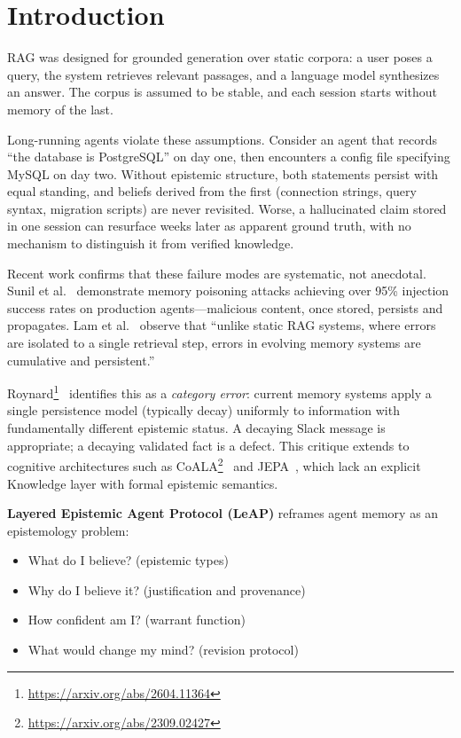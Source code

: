 \documentclass[11pt,letterpaper]{article}
\begin{document}
\section{Introduction}

RAG was designed for grounded generation over static corpora: a user poses a query, the system retrieves relevant passages, and a language model synthesizes an answer. The corpus is assumed to be stable, and each session starts without memory of the last.

Long-running agents violate these assumptions. Consider an agent that records ``the database is PostgreSQL'' on day one, then encounters a config file specifying MySQL on day two. Without epistemic structure, both statements persist with equal standing, and beliefs derived from the first (connection strings, query syntax, migration scripts) are never revisited. Worse, a hallucinated claim stored in one session can resurface weeks later as apparent ground truth, with no mechanism to distinguish it from verified knowledge.

Recent work confirms that these failure modes are systematic, not anecdotal. Sunil et al.~\cite{sunil2026} demonstrate memory poisoning attacks achieving over 95\% injection success rates on production agents---malicious content, once stored, persists and propagates. Lam et al.~\cite{lam2026ssgm} observe that ``unlike static RAG systems, where errors are isolated to a single retrieval step, errors in evolving memory systems are cumulative and persistent.''

Roynard\footnote{\url{https://arxiv.org/abs/2604.11364}}~\cite{roynard2026} identifies this as a \textit{category error}: current memory systems apply a single persistence model (typically decay) uniformly to information with fundamentally different epistemic status. A decaying Slack message is appropriate; a decaying validated fact is a defect. This critique extends to cognitive architectures such as CoALA\footnote{\url{https://arxiv.org/abs/2309.02427}}~\cite{sumers2023coala} and JEPA~\cite{lecun2022path}, which lack an explicit Knowledge layer with formal epistemic semantics.

\textbf{Layered Epistemic Agent Protocol (LeAP)} reframes agent memory as an epistemology problem:
\begin{itemize}[noitemsep]
    \item What do I believe? (epistemic types)
    \item Why do I believe it? (justification and provenance)
    \item How confident am I? (warrant function)
    \item What would change my mind? (revision protocol)
\end{itemize}
\end{document}
